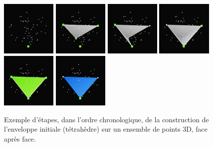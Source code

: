 \documentclass[]{article}
\begin{document}
\begin{figure}[H]
	\begin{center}
		\includegraphics[width=2.65cm]{qh3d/demo3d/init_6.png}
		\includegraphics[width=2.65cm]{qh3d/demo3d/init_5.png}
		\includegraphics[width=2.65cm]{qh3d/demo3d/init_4.png}
		\includegraphics[width=2.65cm]{qh3d/demo3d/init_3.png}
		\includegraphics[width=2.65cm]{qh3d/demo3d/init_2.png}
		\includegraphics[width=2.65cm]{qh3d/demo3d/init_1.png}
	\end{center}
	\caption{Exemple d'étapes, dans l'ordre chronologique, de la construction de l'enveloppe initiale (tétrahèdre) sur un ensemble de points 3D, face après face.}
	\label{fig:env_initiale}
\end{figure}
\end{document}
